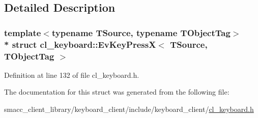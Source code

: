 \subsection{Detailed Description}
\subsubsection*{template$<$typename T\+Source, typename T\+Object\+Tag$>$\\*
struct cl\+\_\+keyboard\+::\+Ev\+Key\+Press\+X$<$ T\+Source, T\+Object\+Tag $>$}



Definition at line 132 of file cl\+\_\+keyboard.\+h.



The documentation for this struct was generated from the following file\+:\begin{DoxyCompactItemize}
\item 
smacc\+\_\+client\+\_\+library/keyboard\+\_\+client/include/keyboard\+\_\+client/\hyperlink{cl__keyboard_8h}{cl\+\_\+keyboard.\+h}\end{DoxyCompactItemize}
